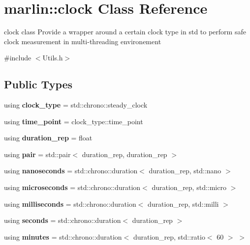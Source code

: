 \section{marlin\+:\+:clock Class Reference}
\label{classmarlin_1_1clock}


clock class Provide a wrapper around a certain clock type in std to perform safe clock measurement in multi-\/threading environement  




{\ttfamily \#include $<$Utils.\+h$>$}

\subsection*{Public Types}
\begin{DoxyCompactItemize}
\item 
\mbox{\label{classmarlin_1_1clock_a4708a33dff42f0945cb0d80df59b5ab1}} 
using {\bfseries clock\+\_\+type} = std\+::chrono\+::steady\+\_\+clock
\item 
\mbox{\label{classmarlin_1_1clock_a4ccac0e6f1ddfeab984299534c50d5d5}} 
using {\bfseries time\+\_\+point} = clock\+\_\+type\+::time\+\_\+point
\item 
\mbox{\label{classmarlin_1_1clock_a9c3aa644316b88b95b7660131c085e69}} 
using {\bfseries duration\+\_\+rep} = float
\item 
\mbox{\label{classmarlin_1_1clock_af6d88a7204e31b6bec2aacd52a3cd577}} 
using {\bfseries pair} = std\+::pair$<$ duration\+\_\+rep, duration\+\_\+rep $>$
\item 
\mbox{\label{classmarlin_1_1clock_afd31d8cc888927c08bb9d3e1b4a7d038}} 
using {\bfseries nanoseconds} = std\+::chrono\+::duration$<$ duration\+\_\+rep, std\+::nano $>$
\item 
\mbox{\label{classmarlin_1_1clock_a4d1e7e98a5b9286c6bd9ae5d430cb1e2}} 
using {\bfseries microseconds} = std\+::chrono\+::duration$<$ duration\+\_\+rep, std\+::micro $>$
\item 
\mbox{\label{classmarlin_1_1clock_ade0c7b3a8b81372b68c0ad2f7adf5be7}} 
using {\bfseries milliseconds} = std\+::chrono\+::duration$<$ duration\+\_\+rep, std\+::milli $>$
\item 
\mbox{\label{classmarlin_1_1clock_abf770923b7fc2482cb1fd7b7e067cef8}} 
using {\bfseries seconds} = std\+::chrono\+::duration$<$ duration\+\_\+rep $>$
\item 
\mbox{\label{classmarlin_1_1clock_a57a42f1c7a80e57f52c0b536ba92a7f7}} 
using {\bfseries minutes} = std\+::chrono\+::duration$<$ duration\+\_\+rep, std\+::ratio$<$ 60 $>$ $>$
\end{DoxyCompactItemize}
